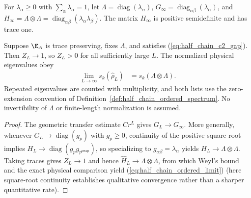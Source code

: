 \begin{definition}%
    \label{def:half_chain_limiting_density}
    \leanok
    For $\lambda_\alpha\geq0$ with $\sum_\alpha\lambda_\alpha=1$, let
    $\Lambda=\operatorname{diag}(\lambda_\alpha)$,
    $G_\infty=\operatorname{diag}_{\alpha\beta}(\lambda_\alpha)$, and
    $H_\infty=\Lambda\otimes\Lambda
        =\operatorname{diag}_{\alpha\beta}(\lambda_\alpha\lambda_\beta)$.
    The matrix $H_\infty$ is positive semidefinite and has trace one.
\end{definition}

\begin{lemma}%
    \label{thm:half_chain_ordered_limit}
    \leanok
    Suppose $\E_A$ is trace preserving, fixes $\Lambda$, and satisfies
    (\ref{eq:half_chain_c2_gap}). Then $Z_L\to1$, so $Z_L>0$ for all
    sufficiently large $L$. The normalized physical eigenvalues obey
    \begin{align}
        \lim_{L\to\infty}s_k(\widehat\rho_L)
         & =s_k(\Lambda\otimes\Lambda)
        .
        \label{eq:half_chain_ordered_limit}
    \end{align}
    Repeated eigenvalues are counted with multiplicity, and both lists use
    the zero-extension convention of Definition~\ref{def:half_chain_ordered_spectrum}.
    No invertibility of $\Lambda$ or finite-length normalization is assumed.
\end{lemma}

\begin{proof}
    \leanok
    The geometric transfer estimate $Cr^L$ gives $G_L\to G_\infty$.
    More generally, whenever $G_L\to\operatorname{diag}(g_p)$ with $g_p\geq0$,
    continuity of the positive square root implies
    $H_L\to\operatorname{diag}(g_p g_{p^{\mathrm{swap}}})$, so specializing to
    $g_{\alpha\beta}=\lambda_\alpha$ yields
    $H_L\to\Lambda\otimes\Lambda$.
    Taking traces gives $Z_L\to1$ and hence
    $\widehat H_L\to\Lambda\otimes\Lambda$, from which Weyl's bound and the
    exact physical comparison yield (\ref{eq:half_chain_ordered_limit})
    (here square-root continuity establishes qualitative convergence rather
    than a sharper quantitative rate).
\end{proof}

